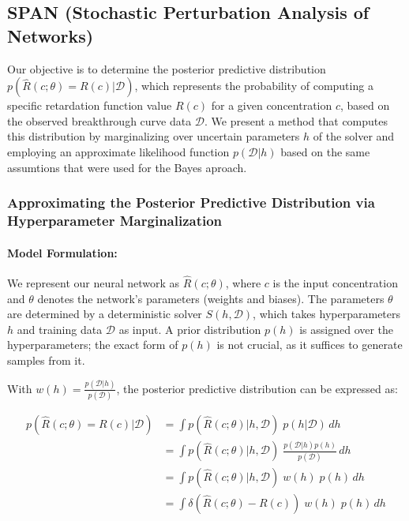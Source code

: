 \documentclass{article}
\begin{document}
\subsection{SPAN (Stochastic Perturbation Analysis of Networks)}
Our objective is to determine the posterior predictive distribution $p(\hat{R}(c; \theta) = R(c)| \mathcal{D})$, which represents the probability of computing a specific retardation function value $R(c)$ for a given concentration $c$, based on the observed breakthrough curve data $\mathcal{D}$. We present a method that computes this distribution by marginalizing over uncertain parameters $h$ of the solver and employing an approximate likelihood function $p(\mathcal{D} | h)$ based on the same assumtions that were used for the Bayes aproach.

\subsubsection{Approximating the Posterior Predictive Distribution via Hyperparameter Marginalization}

\paragraph{Model Formulation:}

We represent our neural network as $\hat{R}(c; \theta)$, where $c$ is the input concentration and $\theta$ denotes the network's parameters (weights and biases). The parameters $\theta$ are determined by a deterministic solver $S(h, \mathcal{D})$, which takes hyperparameters $h$ and training data $\mathcal{D}$ as input. A prior distribution $p(h)$ is assigned over the hyperparameters; the exact form of $p(h)$ is not crucial, as it suffices to generate samples from it.

With $w(h) = \frac{p(\mathcal{D} | h)}{p(\mathcal{D})}$, the posterior predictive distribution can be expressed as:

\begin{align*}
p(\hat{R}(c; \theta) = R(c)| \mathcal{D}) &= \int p(\hat{R}(c; \theta) | h, \mathcal{D})\; p(h | \mathcal{D}) \, dh \\
                                          &= \int p(\hat{R}(c; \theta) | h, \mathcal{D})\; \frac{p(\mathcal{D} | h) p(h)}{p(\mathcal{D})} \, dh \\
                                          &= \int p(\hat{R}(c; \theta) | h, \mathcal{D})\; w(h)\; p(h) \, dh \\
                                          &= \int \delta(\hat{R}(c; \theta) - R(c))\; w(h)\; p(h) \, dh \\
\end{align*}
\end{document}
